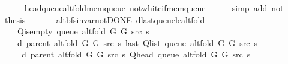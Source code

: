\begin{isabellebody}
\ \ \ \ \isamarkupfalse%
\ head{\isacharunderscore}{\kern0pt}queue{\isacharunderscore}{\kern0pt}alt{\isacharunderscore}{\kern0pt}fold{\isacharunderscore}{\kern0pt}mem{\isacharunderscore}{\kern0pt}queue\ not{\isacharunderscore}{\kern0pt}white{\isacharunderscore}{\kern0pt}if{\isacharunderscore}{\kern0pt}mem{\isacharunderscore}{\kern0pt}queue\isanewline
\ \ \ \ \isamarkupfalse%
\ {\isacharparenleft}{\kern0pt}simp\ add{\isacharcolon}{\kern0pt}\ not{\isacharunderscore}{\kern0pt}{\isacharparenleft}{\kern0pt}{}{\isacharparenright}{\kern0pt}{\isacharparenright}{\kern0pt}\isanewline
\ \ \isamarkupfalse%
\ \isamarkupfalse%
\ {\isacharquery}{\kern0pt}thesis\isanewline
\ \ \ \ \isacommand{{\isachardot}{\kern0pt}}\isamarkupfalse%
\isanewline
{}\isamarkupfalse%
%
\endisatagproof
{\isafoldproof}%
%
\isadelimproof
\isanewline
%
\endisadelimproof
\isanewline
{}\isamarkupfalse%
\ {\isacharparenleft}{\kern0pt}\ alt{\isacharunderscore}{\kern0pt}bfs{\isacharunderscore}{\kern0pt}invar{\isacharunderscore}{\kern0pt}not{\isacharunderscore}{\kern0pt}DONE{\isacharparenright}{\kern0pt}\ d{\isacharunderscore}{\kern0pt}last{\isacharunderscore}{\kern0pt}queue{\isacharunderscore}{\kern0pt}le{\isacharunderscore}{\kern0pt}alt{\isacharunderscore}{\kern0pt}fold{\isacharcolon}{\kern0pt}\isanewline
\ \ \ {\isachardoublequoteopen}{\isasymnot}\ Q{\isacharunderscore}{\kern0pt}is{\isacharunderscore}{\kern0pt}empty\ {\isacharparenleft}{\kern0pt}queue\ {\isacharparenleft}{\kern0pt}alt{\isacharunderscore}{\kern0pt}fold\ G{}\ G{}\ src\ s{\isacharparenright}{\kern0pt}{\isacharparenright}{\kern0pt}{\isachardoublequoteclose}\isanewline
\ \ \isanewline
\ \ \ \ {\isachardoublequoteopen}d\ {\isacharparenleft}{\kern0pt}parent\ {\isacharparenleft}{\kern0pt}alt{\isacharunderscore}{\kern0pt}fold\ G{}\ G{}\ src\ s{\isacharparenright}{\kern0pt}{\isacharparenright}{\kern0pt}\ {\isacharparenleft}{\kern0pt}last\ {\isacharparenleft}{\kern0pt}Q{\isacharunderscore}{\kern0pt}list\ {\isacharparenleft}{\kern0pt}queue\ {\isacharparenleft}{\kern0pt}alt{\isacharunderscore}{\kern0pt}fold\ G{}\ G{}\ src\ s{\isacharparenright}{\kern0pt}{\isacharparenright}{\kern0pt}{\isacharparenright}{\kern0pt}{\isacharparenright}{\kern0pt}\ {\isasymle}\isanewline
\ \ \ \ \ d\ {\isacharparenleft}{\kern0pt}parent\ {\isacharparenleft}{\kern0pt}alt{\isacharunderscore}{\kern0pt}fold\ G{}\ G{}\ src\ s{\isacharparenright}{\kern0pt}{\isacharparenright}{\kern0pt}\ {\isacharparenleft}{\kern0pt}Q{\isacharunderscore}{\kern0pt}head\ {\isacharparenleft}{\kern0pt}queue\ {\isacharparenleft}{\kern0pt}alt{\isacharunderscore}{\kern0pt}fold\ G{}\ G{}\ src\ s{\isacharparenright}{\kern0pt}{\isacharparenright}{\kern0pt}{\isacharparenright}{\kern0pt}\ {\isacharplus}{\kern0pt}\ {}{\isachardoublequoteclose}\isanewline

\end{isabellebody}
